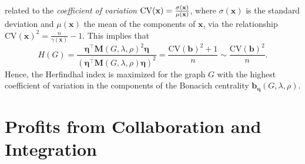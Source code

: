 related to the \emph{coefficient of variation} $\mathrm{CV}(\mathbf{x}) = \frac{%
\sigma(\mathbf{x})}{\mu(\mathbf{x})}$, where $\sigma(\mathbf{x})$ is the
standard deviation and $\mu(\mathbf{x})$ the mean of the components of $%
\mathbf{x}$, via the relationship $\mathrm{CV}(\mathbf{x})^2 = \frac{n}{\gamma(\mathbf{x})}-1$. This implies that
\begin{equation*}
H(G) =\frac{\bm{\eta}^\top \mathbf{M}(G,\lambda,\rho)^2 \bm{\eta}}{(\bm{\eta}
^\top \mathbf{M}(G,\lambda,\rho)\bm{\eta})^2} = \frac{\mathrm{CV}(\mathbf{b})^2+1}{n} \sim
\frac{\mathrm{CV}(\mathbf{b})^2}{n}.
\end{equation*}
Hence, the Herfindhal index is maximized for the graph $G$ with the highest coefficient of variation in the components of the Bonacich centrality $\mathbf{b}_{\bm{\eta}}(G,\lambda,\rho)$. %

\section{Profits from Collaboration and Integration}

